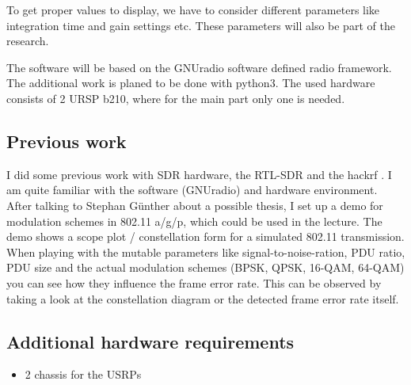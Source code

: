 \documentclass[NET,a4,12pt,ngerman]{netforms}
\begin{document}
To get proper values to display, we have to consider different parameters like
integration time and gain settings etc.
These parameters will also be part of the research.

The software will be based on the GNUradio \cite{gnuradio} software defined radio
framework.  The additional work is planed to be done with python3.
The used hardware consists of 2 URSP b210, where for the main part only one is
needed.


\subsection*{Previous work}
I did some previous work with SDR hardware, the RTL-SDR \cite{rtlsdr} and the
hackrf \cite{hackrf}.  I am quite familiar with the software (GNUradio) and
hardware environment.
After talking to Stephan Günther about a possible thesis, I set up a demo
\cite{gnuradiodemo}\cite{gnuradiodemo2} for modulation schemes in 802.11 a/g/p,
which could be used in the lecture.
The demo shows a scope plot / constellation form for a simulated 802.11
transmission.
When playing with the mutable parameters like signal-to-noise-ration, PDU
ratio, PDU size and the actual modulation schemes (BPSK, QPSK, 16-QAM, 64-QAM)
you can see how they influence the frame error rate.
This can be observed by taking a look at the constellation diagram or the
detected frame error rate itself.

\subsection*{Additional hardware requirements}
\begin{itemize}
	\item 2 chassis for the USRPs \cite{chassiusrp}
\end{itemize}



\end{document}
